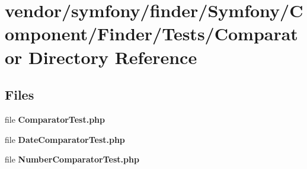 \section{vendor/symfony/finder/\+Symfony/\+Component/\+Finder/\+Tests/\+Comparator Directory Reference}
\label{dir_ee838ea1bf7235cad746394dc4702216}
\subsection*{Files}
\begin{DoxyCompactItemize}
\item 
file {\bf Comparator\+Test.\+php}
\item 
file {\bf Date\+Comparator\+Test.\+php}
\item 
file {\bf Number\+Comparator\+Test.\+php}
\end{DoxyCompactItemize}
